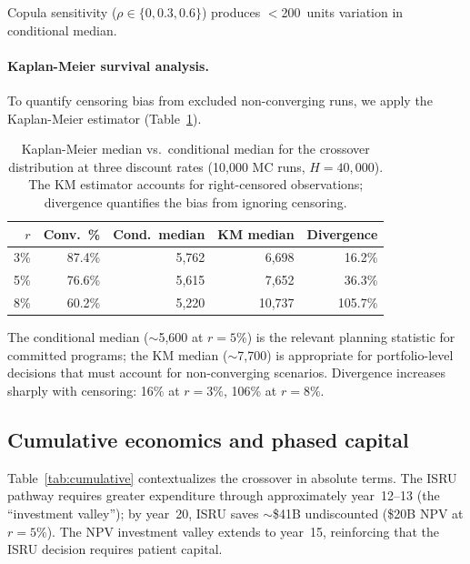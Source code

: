 \documentclass[preprint,12pt]{elsarticle}
\begin{document}
Copula sensitivity ($\rho \in \{0, 0.3, 0.6\}$) produces $<$200~units variation in conditional median.

\paragraph{Kaplan-Meier survival analysis.} To quantify censoring bias from excluded non-converging runs, we apply the Kaplan-Meier estimator \cite{kaplan1958} (Table~\ref{tab:kaplan_meier}).

\begin{table}[htbp]
\centering
\caption{Kaplan-Meier median vs.\ conditional median for the crossover distribution at three discount rates (10{,}000 MC runs, $H = 40{,}000$). The KM estimator accounts for right-censored observations; divergence quantifies the bias from ignoring censoring.}
\label{tab:kaplan_meier}
\small
\begin{tabular}{@{}rrrrr@{}}
\toprule
$r$ & Conv.\ \% & Cond.\ median & KM median & Divergence \\
\midrule
3\%  & 87.4\% & 5{,}762 & 6{,}698  & 16.2\% \\
5\%  & 76.6\% & 5{,}615 & 7{,}652  & 36.3\% \\
8\%  & 60.2\% & 5{,}220 & 10{,}737 & 105.7\% \\
\bottomrule
\end{tabular}
\end{table}

The conditional median ($\sim$5{,}600 at $r = 5\%$) is the relevant planning statistic for committed programs; the KM median ($\sim$7{,}700) is appropriate for portfolio-level decisions that must account for non-converging scenarios. Divergence increases sharply with censoring: 16\% at $r = 3\%$, 106\% at $r = 8\%$.

\subsection{Cumulative economics and phased capital}
\label{sec:phased_capital}

Table~\ref{tab:cumulative} contextualizes the crossover in absolute terms. The ISRU pathway requires greater expenditure through approximately year~12--13 (the ``investment valley''); by year~20, ISRU saves $\sim$\$41B undiscounted (\$20B NPV at $r = 5\%$). The NPV investment valley extends to year~15, reinforcing that the ISRU decision requires patient capital.
\end{document}
